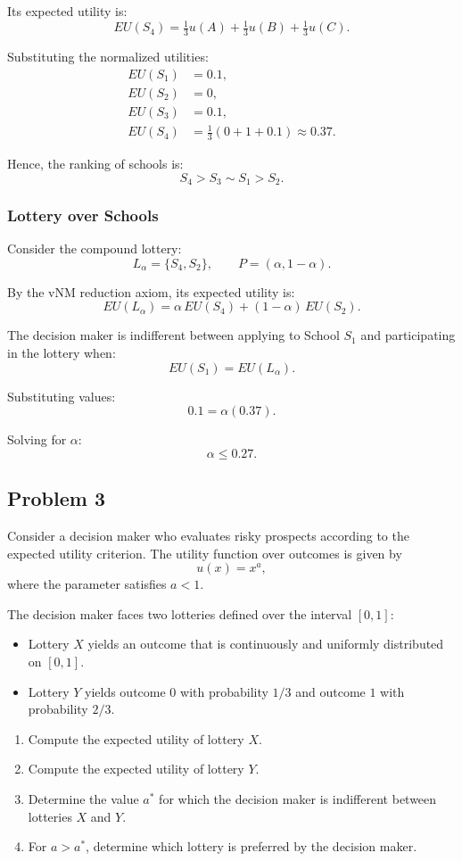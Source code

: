 \documentclass[12pt]{article}
\begin{document}
Its expected utility is:
\[
EU(S_4) = \tfrac{1}{3}u(A) + \tfrac{1}{3}u(B) + \tfrac{1}{3}u(C).
\]

Substituting the normalized utilities:
\[
\begin{aligned}
EU(S_1) &= 0.1, \\
EU(S_2) &= 0, \\
EU(S_3) &= 0.1, \\
EU(S_4) &= \tfrac{1}{3}(0 + 1 + 0.1) \approx 0.37.
\end{aligned}
\]

Hence, the ranking of schools is:
\[
S_4 > S_3 \sim S_1 > S_2.
\]

\subsubsection*{Lottery over Schools}
Consider the compound lottery:
\[
L_\alpha = \{S_4, S_2\}, \qquad P = (\alpha, 1-\alpha).
\]

By the vNM reduction axiom, its expected utility is:
\[
EU(L_\alpha) = \alpha\,EU(S_4) + (1-\alpha)\,EU(S_2).
\]

The decision maker is indifferent between applying to School $S_1$ and participating in the lottery when:
\[
EU(S_1) = EU(L_\alpha).
\]

Substituting values:
\[
0.1 = \alpha(0.37).
\]

Solving for $\alpha$:
\[
\alpha \leq 0.27.
\]

\newpage

\subsection*{Problem 3}
Consider a decision maker who evaluates risky prospects according to the expected utility criterion. The utility function over outcomes is given by
\[
u(x) = x^{a},
\]
where the parameter satisfies $a<1$.

The decision maker faces two lotteries defined over the interval $[0,1]$:
\begin{itemize}
\item Lottery $X$ yields an outcome that is continuously and uniformly distributed on $[0,1]$.
\item Lottery $Y$ yields outcome $0$ with probability $1/3$ and outcome $1$ with probability $2/3$.
\end{itemize}

\begin{enumerate}
\item Compute the expected utility of lottery $X$.
\item Compute the expected utility of lottery $Y$.
\item Determine the value $a^*$ for which the decision maker is indifferent between lotteries $X$ and $Y$.
\item For $a>a^*$, determine which lottery is preferred by the decision maker.
\end{enumerate}
\end{document}
